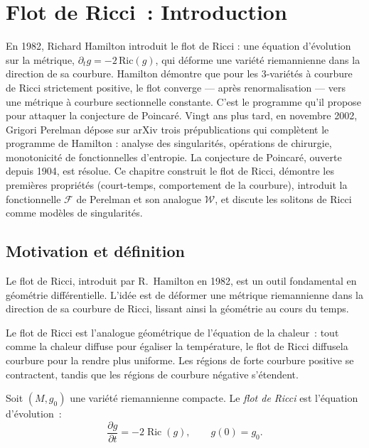 \chapter{Flot de Ricci~: Introduction}
\label{ch:ricci_flow}

En 1982, Richard Hamilton introduit le flot de Ricci : une équation d'évolution sur la métrique, $\partial_t g = -2\,\mathrm{Ric}(g)$, qui déforme une variété riemannienne dans la direction de sa courbure. Hamilton démontre que pour les 3-variétés à courbure de Ricci strictement positive, le flot converge --- après renormalisation --- vers une métrique à courbure sectionnelle constante. C'est le programme qu'il propose pour attaquer la conjecture de Poincaré. Vingt ans plus tard, en novembre 2002, Grigori Perelman dépose sur arXiv trois prépublications qui complètent le programme de Hamilton : analyse des singularités, opérations de chirurgie, monotonicité de fonctionnelles d'entropie. La conjecture de Poincaré, ouverte depuis 1904, est résolue. Ce chapitre construit le flot de Ricci, démontre les premières propriétés (court-temps, comportement de la courbure), introduit la fonctionnelle $\mathcal{F}$ de Perelman et son analogue $\mathcal{W}$, et discute les solitons de Ricci comme modèles de singularités.

\section{Motivation et d\'efinition}

Le flot de Ricci, introduit par R.~Hamilton en 1982, est un outil fondamental
en g\'eom\'etrie diff\'erentielle. L'id\'ee est de d\'eformer une m\'etrique riemannienne
dans la direction de sa courbure de Ricci, lissant ainsi la g\'eom\'etrie au cours
du temps.

\begin{intuition}
Le flot de Ricci est l'analogue g\'eom\'etrique de l'\'equation de la chaleur~: tout
comme la chaleur diffuse pour \'egaliser la temp\'erature, le flot de Ricci
\og{}diffuse\fg la courbure pour la rendre plus uniforme. Les r\'egions de forte
courbure positive se contractent, tandis que les r\'egions de courbure n\'egative
s'\'etendent.
\end{intuition}

\begin{definition}
Soit $(M, g_0)$ une vari\'et\'e riemannienne compacte. Le \emph{flot de Ricci} est
l'\'equation d'\'evolution~:
\[
    \frac{\partial g}{\partial t} = -2\operatorname{Ric}(g), \qquad g(0) = g_0.
\]
\end{definition}

